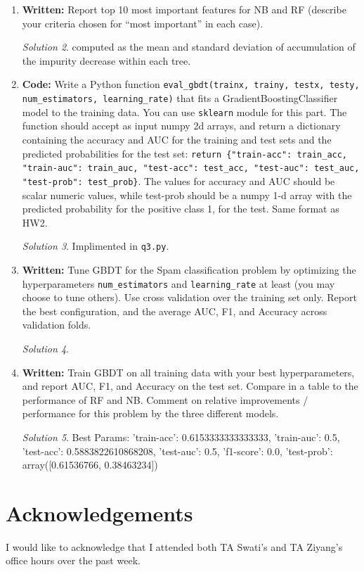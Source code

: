 \documentclass[a4paper,12pt]{article}
\theoremstyle{definition}
\theoremstyle{remark}
\newtheorem*{solution}{Solution}
\begin{document}
\begin{enumerate}
\begin{enumerate}
			\begin{solution}
				Best Params:
				{'train-acc': 0.9493164388129376, 'train-auc': 0.941931211339843, 'test-acc': 0.9275, 'test-auc': 0.9185817560823003, 'f1-score': 0.9079365079365079, 'test-prob': array([0.99657635, 0.00342365])}
			\end{solution}
			\item {\bf Written:} Report top 10 most important features for NB and RF (describe your criteria chosen for “most
			important” in each case).
			\begin{solution}
				computed as the mean and standard deviation of accumulation of the impurity decrease within each tree.
			\end{solution}
			\item {\bf Code:} Write a Python function {\tt eval\_gbdt(trainx, trainy, testx, testy, num\_estimators, learning\_rate)} that fits
			a GradientBoostingClassifier model to the training data. You can use {\tt sklearn} module for this part. The function should accept as input numpy 2d arrays, and return a dictionary containing the accuracy and AUC for the training and test sets and the predicted probabilities for the test set: {\tt return \{"train-acc": train\_acc, "train-auc": train\_auc, "test-acc": test\_acc, "test-auc": test\_auc, "test-prob": test\_prob\}}. The values for accuracy and AUC should be scalar numeric values, while test-prob should be a numpy 1-d array with the predicted probability for the positive class 1, for the test. Same format as HW2.
			\begin{solution}
				 Implimented in \texttt{q3.py}.
			\end{solution}
			\item {\bf Written:} Tune GBDT for the Spam classification problem by optimizing the hyperparameters {\tt num\_estimators} and {\tt learning\_rate} at least (you may choose to tune others). Use cross validation over the training set only. Report the best configuration, and the average AUC, F1, and Accuracy across validation folds.
			\begin{solution}
				
			\end{solution}
			\item {\bf Written:} Train GBDT on all training data with your best hyperparameters, and report AUC, F1, and Accuracy
			on the test set. Compare in a table to the performance of RF and NB. Comment on relative improvements / performance for this problem by the three different models.
			\begin{solution}
			Best Params:
			{'train-acc': 0.6153333333333333, 'train-auc': 0.5, 'test-acc': 0.5883822610868208, 'test-auc': 0.5, 'f1-score': 0.0, 'test-prob': array([0.61536766, 0.38463234])}
			\end{solution}
		\end{enumerate}
		
	\end{enumerate}
	
	
	
	
	\section*{Acknowledgements}
	I would like to acknowledge that I attended both TA Swati's and TA Ziyang's office hours over the past week.
	
\end{document}
